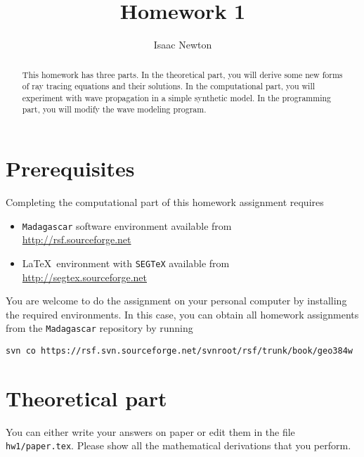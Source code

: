 \author{Isaac Newton} 
\title{Homework 1}

\begin{abstract}
  This homework has three parts. In the theoretical part, you will
  derive some new forms of ray tracing equations and their solutions.
  In the computational part, you will experiment with wave propagation
  in a simple synthetic model. In the programming part, you will modify
  the wave modeling program.
\end{abstract}

\section{Prerequisites}

Completing the computational part of this homework assignment requires
\begin{itemize}
\item \texttt{Madagascar} software environment available from \\
\url{http://rsf.sourceforge.net}
\item \LaTeX\ environment with \texttt{SEGTeX} available from \\ 
\url{http://segtex.sourceforge.net}
\end{itemize}

You are welcome to do the assignment on your personal computer by
installing the required environments. In this case, you can obtain all
homework assignments from the \texttt{Madagascar} repository by running
\begin{verbatim}
svn co https://rsf.svn.sourceforge.net/svnroot/rsf/trunk/book/geo384w 
\end{verbatim}


\section{Theoretical part}

You can either write your answers on paper or edit them in the file
\verb#hw1/paper.tex#. Please show all the mathematical
derivations that you perform.

